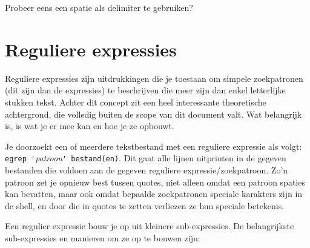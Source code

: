 \documentclass[a4paper,twoside,openany]{memoir}
\begin{document}
Probeer eens een spatie als delimiter te gebruiken?

\chapter{Reguliere expressies}

Reguliere expressies zijn uitdrukkingen die je toestaan om simpele zoekpatronen (dit zijn dan de expressies) te beschrijven die meer zijn dan enkel letterlijke stukken tekst. Achter dit concept zit een heel interessante theoretische achtergrond, die volledig buiten de scope van dit document valt. Wat belangrijk is, is wat je er mee kan en hoe je ze opbouwt.

Je doorzoekt een of meerdere tekstbestand met een reguliere expressie als volgt: \verb!egrep '!\emph{patroon}\verb!' bestand(en)!. Dit gaat alle lijnen uitprinten in de gegeven bestanden die voldoen aan de gegeven reguliere expressie/zoekpatroon. Zo'n patroon zet je opnieuw best tussen quotes, niet alleen omdat een patroon spaties kan bevatten, maar ook omdat bepaalde zoekpatronen speciale karakters zijn in de shell, en door die in quotes te zetten verliezen ze hun speciale betekenis.

Een regulier expressie bouw je op uit kleinere sub-expressies. De belangrijkste sub-expressies en manieren om ze op te bouwen zijn:
\end{document}
